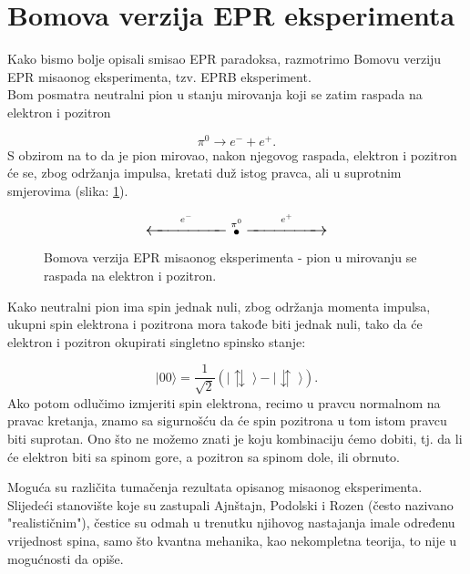 \section{Bomova verzija EPR eksperimenta}

Kako bismo bolje opisali smisao EPR paradoksa, razmotrimo Bomovu verziju EPR misaonog eksperimenta, tzv. EPRB eksperiment.\\

Bom posmatra neutralni pion u stanju mirovanja koji se zatim raspada na elektron i pozitron

\begin{equation}
  \pi^0 \rightarrow e^- + e^+.
\end{equation}
S obzirom na to da je pion mirovao, nakon njegovog raspada, elektron i pozitron će se, zbog odr\v zanja impulsa, kretati du\v z istog pravca, ali u suprotnim smjerovima (slika: \ref{fig:pion_decay}).

\begin{figure}[H]
  \[
    \Large{
      \overset{e^-}{\xleftarrow{\hspace{2cm}}}
      \overset{\pi^0}{\bullet}
      \overset{e^+}{\xrightarrow{\hspace{2cm}}}
    }
  \]
  \caption{Bomova verzija EPR misaonog eksperimenta - pion u mirovanju se raspada na elektron i pozitron.}
  \label{fig:pion_decay}
\end{figure}


Kako neutralni pion ima spin jednak nuli, zbog održanja momenta impulsa, ukupni spin elektrona i pozitrona mora takođe biti jednak nuli,
tako da će elektron i pozitron okupirati singletno spinsko stanje:

\begin{equation}
  | 00 \rangle = \frac{1}{\sqrt2}(| \updownarrows \; \rangle - | \downuparrows \; \rangle). \label{eq:singlet_state}
\end{equation}
Ako potom odlučimo izmjeriti spin elektrona, recimo u pravcu normalnom na pravac kretanja, znamo sa sigurnošću da će spin pozitrona u tom istom pravcu biti suprotan.
Ono što ne možemo znati je koju kombinaciju ćemo dobiti, tj. da li će elektron biti sa spinom gore, a pozitron sa spinom dole, ili obrnuto.

Moguća su različita tumačenja rezultata opisanog misaonog eksperimenta.
Slijedeći stanovište koje su zastupali Ajnštajn, Podolski i Rozen (često nazivano "realističnim"), čestice su odmah u trenutku njihovog nastajanja imale određenu vrijednost spina, samo što kvantna mehanika, kao nekompletna teorija, to nije u mogućnosti da opiše.

